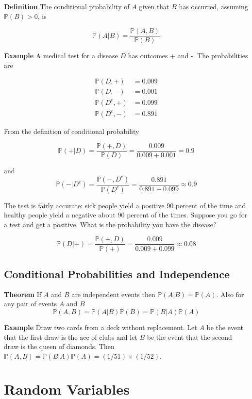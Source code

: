 \documentclass[
]{book}
\theoremstyle{definition}
\theoremstyle{definition}
\theoremstyle{definition}
\theoremstyle{definition}
\theoremstyle{remark}
\begin{document}
\textbf{Definition} The conditional probability of \(A\) given that \(B\) has occurred, assuming \(\mathbb{P}(B)>0\), is

\[
\mathbb{P}(A|B)=\frac{\mathbb{P}(A,B)}{\mathbb{P}(B)}
\]

\textbf{Example} A medical test for a disease \(D\) has outcomes + and -. The probabilities are

\begin{align}
\mathbb{P}(D,+)&=0.009\\
\mathbb{P}(D,-)&=0.001 \\
\mathbb{P}(D^c,+)&=0.099\\
\mathbb{P}(D^c,-)&=0.891
\end{align}

From the definition of conditional probability

\[
\mathbb{P}(+|D)=\frac{\mathbb{P}(+,D)}{\mathbb{P}(D)}=\frac{0.009}{0.009+0.001}=0.9
\]

and
\[
\mathbb{P}(-|D^c)=\frac{\mathbb{P}(-,D^c)}{\mathbb{P}(D^c)}=\frac{0.891}{0.891+0.099}\approx 0.9
\]

The test is fairly accurate: sick people yield a positive 90 percent of the time and healthy people yield a negative about 90 percent of the times. Suppose you go for a test and get a positive. What is the probability you have the disease?

\[
\mathbb{P}(D|+)=\frac{\mathbb{P}(+,D)}{\mathbb{P}(+)}=\frac{0.009}{0.009+0.099}\approx 0.08
\]

\hypertarget{conditional-probabilities-and-independence}{%
\subsection{Conditional Probabilities and Independence}\label{conditional-probabilities-and-independence}}

\textbf{Theorem} If \(A\) and \(B\) are independent events then \(\mathbb{P}(A|B)=\mathbb{P}(A)\). Also for any pair of events \(A\) and \(B\)
\[
\mathbb{P}(A,B)=\mathbb{P}(A|B)\mathbb{P}(B)=\mathbb{P}(B|A)\mathbb{P}(A)
\]

\textbf{Example} Draw two cards from a deck without replacement. Let \(A\) be the event that the first draw is the ace of clubs and let \(B\) be the event that the second draw is the queen of diamonds. Then \(\mathbb{P}(A,B)=\mathbb{P}(B|A)\mathbb{P}(A)=(1/51)\times (1/52)\).

\hypertarget{random-variables}{%
\section{Random Variables}\label{random-variables}}
\end{document}

